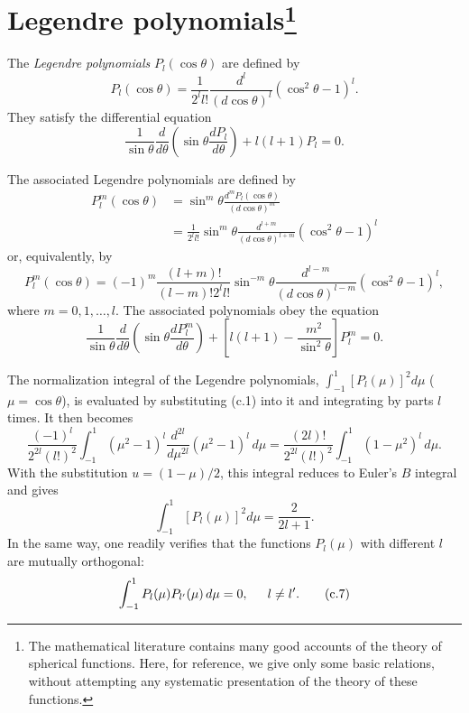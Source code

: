 \renewcommand{\thesection}{\alph{section}}
\setcounter{section}{2}
\section[Legendre polynomials]{Legendre polynomials\protect\footnote{The mathematical literature contains many good accounts of the theory of spherical functions. Here, for reference, we give only some basic relations, without attempting any systematic presentation of the theory of these functions.}}

The \emph{Legendre polynomials} $P_l(\cos\theta)$ are defined by
\begin{equation}
 P_l(\cos\theta)=\frac1{2^ll!}
 \frac{d^l}{(d\cos\theta)^l}(\cos^2\theta-1)^l.
 \tag{c.1}
\end{equation}
They satisfy the differential equation
\begin{equation}
 \frac1{\sin\theta}\frac d{d\theta}
 \left(\sin\theta\frac{dP_l}{d\theta}\right)+l(l+1)P_l=0.
 \tag{c.2}
\end{equation}

The associated Legendre polynomials are defined by
\begin{equation}
 \begin{split}
 P_l^m(\cos\theta)
 &=\sin^m\theta\frac{d^mP_l(\cos\theta)}{(d\cos\theta)^m}\\
 &=\frac1{2^ll!}\sin^m\theta
 \frac{d^{l+m}}{(d\cos\theta)^{l+m}}(\cos^2\theta-1)^l
 \end{split}
 \tag{c.3}
\end{equation}
or, equivalently, by
\begin{equation}
 P_l^m(\cos\theta)=(-1)^m\frac{(l+m)!}{(l-m)!2^ll!}
 \sin^{-m}\theta\frac{d^{l-m}}{(d\cos\theta)^{l-m}}
 (\cos^2\theta-1)^l,
 \tag{c.4}
\end{equation}
where $m=0,1,\ldots,l$. The associated polynomials obey the equation
\begin{equation}
 \frac1{\sin\theta}\frac d{d\theta}
 \left(\sin\theta\frac{dP_l^m}{d\theta}\right)
 +\left[l(l+1)-\frac{m^2}{\sin^2\theta}\right]P_l^m=0.
 \tag{c.5}
\end{equation}

The normalization integral of the Legendre polynomials,
$\int_{-1}^{1}[P_l(\mu)]^2d\mu$ ($\mu=\cos\theta$), is evaluated by
substituting (c.1) into it and integrating by parts $l$ times. It then becomes
\[
 \frac{(-1)^l}{2^{2l}(l!)^2}\int_{-1}^{1}(\mu^2-1)^l
 \frac{d^{2l}}{d\mu^{2l}}(\mu^2-1)^l\,d\mu
 =\frac{(2l)!}{2^{2l}(l!)^2}\int_{-1}^{1}(1-\mu^2)^l\,d\mu.
\]
With the substitution $u=(1-\mu)/2$, this integral reduces to Euler's
$B$ integral and gives
\begin{equation}
 \int_{-1}^{1}[P_l(\mu)]^2d\mu=\frac2{2l+1}.
 \tag{c.6}
\end{equation}
In the same way, one readily verifies that the functions $P_l(\mu)$ with
different $l$ are mutually orthogonal:
\begin{equation}
 \int_{-1}^{1}P_l(\mu)P_{l'}(\mu)\,d\mu=0,\hspace{1.5em}l\ne l'.
 \tag{c.7}
\end{equation}

